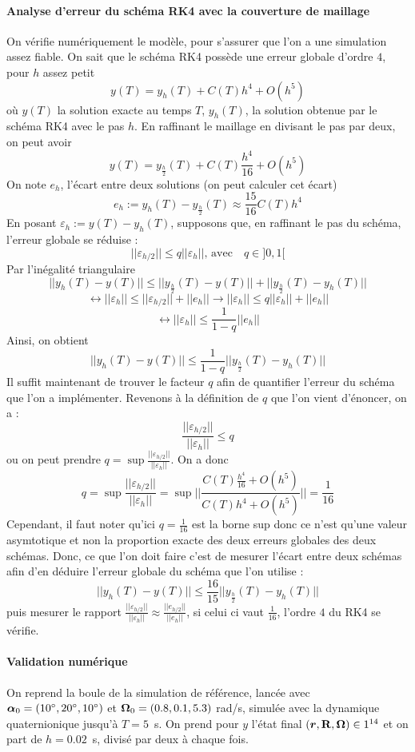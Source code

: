 \paragraph{Analyse d'erreur du schéma RK4 avec la couverture de maillage}
On vérifie numériquement le modèle, pour s'assurer que l'on a une simulation assez fiable. On sait que le schéma RK4 possède une erreur globale d'ordre $4$, pour $h$ assez petit
\[
    y(T) = y_h (T) + C(T)h ^4 + O(h ^5)
\]
où $y(T)$ la solution exacte au temps $T$, $y_h(T)$, la solution obtenue par le schéma RK4 avec le pas $h$. En raffinant le maillage en divisant le pas par deux, on peut avoir
\[
y(T) = y_{\frac{h}{2}} (T) + C(T)\frac{h ^4}{16} + O(h ^5)
\]
On note $e_h$, l'écart entre deux solutions (on peut calculer cet écart)
\[
e_h := y_h (T) - y_{\frac{h}{2}} (T) \approx \frac{15}{16}C(T) h^4
\]
En posant $\varepsilon_h :=  y(T) - y_{h} (T)$, supposons que, en raffinant le pas du schéma, l'erreur globale se réduise : 
\[
||\varepsilon_{h/2} || \le q||\varepsilon_h||,\, \text{avec} \quad  q \in ]0, 1[
\]
Par l'inégalité triangulaire
\[
||y_h(T) - y(T)|| \le ||y_{\frac{h}{2}}(T) - y(T)|| + ||y_{\frac{h}{2}}(T) - y_h(T)||
\]
\[
\longleftrightarrow ||\varepsilon_h|| \le ||\varepsilon_{h/2} || + || e_h|| \longrightarrow ||\varepsilon_h|| \le q||\varepsilon_h|| + || e_h||
\]
\[
\longleftrightarrow ||\varepsilon_h|| \le \frac{1}{1-q}|| e_h||
\]
Ainsi, on obtient
\[
||y_h(T) - y(T)|| \le \frac{1}{1-q} ||y_{\frac{h}{2}}(T) - y_h(T)||
\]
Il suffit maintenant de trouver le facteur $q$ afin de quantifier l'erreur du schéma que l'on a implémenter. Revenons à la définition de $q$ que l'on vient d'énoncer, on a : 
\[\frac{||\varepsilon_{h/2} || }{||\varepsilon_h||}\le q  \]
ou on peut prendre $q = \sup \frac{||\varepsilon_{h/2} || }{||\varepsilon_h||}$. On a donc 
\[
q = \sup \frac{||\varepsilon_{h/2} || }{||\varepsilon_h||} = \sup ||\frac{C(T) \frac{h ^4}{ 16} + O(h ^5)}{C(T)h ^4 + O(h ^5) }|| = \frac{1}{16}
\]
Cependant, il faut noter qu'ici $q = \frac{1}{16}$ est la borne sup donc ce n'est qu'une valeur asymtotique et non la proportion exacte des deux erreurs globales des deux schémas. Donc, ce que l'on doit faire c'est de mesurer l'écart entre deux schémas afin d'en déduire l'erreur globale du schéma que l'on utilise : 
\[
||y_h(T) - y(T)|| \le \frac{16}{15}||y_{\frac{h}{2}}(T) - y_h(T)||
\]
puis mesurer le rapport $\frac{||\varepsilon_{h/2} || }{||\varepsilon_h||} \approx \frac{||e_{h/2} || }{||e_h||}$, si celui ci vaut $\frac{1}{16}$, l'ordre $4$ du RK4 se vérifie.

\paragraph{Validation numérique}
On reprend la boule de la simulation de référence, lancée avec
$\bm{\alpha}_0 = (10^\circ, 20^\circ, 10^\circ)$ et
$\bm{\Omega}_0 = (0.8, 0.1, 5.3)$ rad/s, simulée avec la dynamique quaternionique jusqu'à $T = 5$~s. On prend pour $y$ l'état final
$(\bm{r}, \mathbf{R}, \bm{\Omega}) \in 1^{14}$ et on part de
$h = 0.02$~s, divisé par deux à chaque fois.

